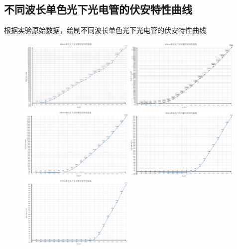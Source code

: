 \documentclass[12pt,a4paper]{article}
\begin{document}
	\subsection{不同波长单色光下光电管的伏安特性曲线}
	根据实验原始数据，绘制不同波长单色光下光电管的伏安特性曲线\\
	\begin{figure}[H]
		\centering
		\includegraphics[width=0.49\textwidth]{365nm.png}
		\includegraphics[width=0.49\textwidth]{405nm.png}
		\includegraphics[width=0.49\textwidth]{436nm.png}
		\includegraphics[width=0.49\textwidth]{546nm.png}
		\includegraphics[width=0.49\textwidth]{577nm.png}

\end{figure}
\end{document}
